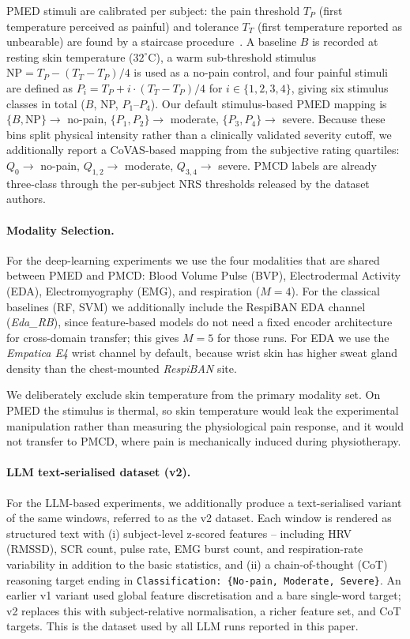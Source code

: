 \documentclass{article}
\begin{document}
PMED stimuli are calibrated per subject: the pain threshold $T_P$ (first temperature perceived as painful) and tolerance $T_T$ (first temperature reported as unbearable) are found by a staircase procedure~\citep{gouverneur2024painmonit}. A baseline $B$ is recorded at resting skin temperature ($32^{\circ}$C), a warm sub-threshold stimulus $\text{NP} = T_P - (T_T - T_P)/4$ is used as a no-pain control, and four painful stimuli are defined as $P_i = T_P + i \cdot (T_T - T_P)/4$ for $i \in \{1,2,3,4\}$, giving six stimulus classes in total ($B$, NP, $P_1$--$P_4$). Our default stimulus-based PMED mapping is $\{B, \text{NP}\}\to$ no-pain, $\{P_1, P_2\}\to$ moderate, $\{P_3, P_4\}\to$ severe. Because these bins split physical intensity rather than a clinically validated severity cutoff, we additionally report a CoVAS-based mapping from the subjective rating quartiles: $Q_0 \to$ no-pain, $Q_{1,2} \to$ moderate, $Q_{3,4} \to$ severe. PMCD labels are already three-class through the per-subject NRS thresholds released by the dataset authors.

\paragraph{Modality Selection.}
For the deep-learning experiments we use the four modalities that are shared between PMED and PMCD: Blood Volume Pulse (BVP), Electrodermal Activity (EDA), Electromyography (EMG), and respiration ($M=4$). For the classical baselines (RF, SVM) we additionally include the RespiBAN EDA channel (\textit{Eda\_RB}), since feature-based models do not need a fixed encoder architecture for cross-domain transfer; this gives $M=5$ for those runs. For EDA we use the \textit{Empatica E4} wrist channel by default, because wrist skin has higher sweat gland density than the chest-mounted \textit{RespiBAN} site.

We deliberately exclude skin temperature from the primary modality set. On PMED the stimulus is thermal, so skin temperature would leak the experimental manipulation rather than measuring the physiological pain response, and it would not transfer to PMCD, where pain is mechanically induced during physiotherapy.

\paragraph{LLM text-serialised dataset (v2).} For the LLM-based experiments, we additionally produce a text-serialised variant of the same windows, referred to as the v2 dataset. Each window is rendered as structured text with (i) subject-level z-scored features -- including HRV (RMSSD), SCR count, pulse rate, EMG burst count, and respiration-rate variability in addition to the basic statistics, and (ii) a chain-of-thought (CoT) reasoning target ending in \texttt{Classification: \{No-pain, Moderate, Severe\}}. An earlier v1 variant used global feature discretisation and a bare single-word target; v2 replaces this with subject-relative normalisation, a richer feature set, and CoT targets. This is the dataset used by all LLM runs reported in this paper.
\end{document}

